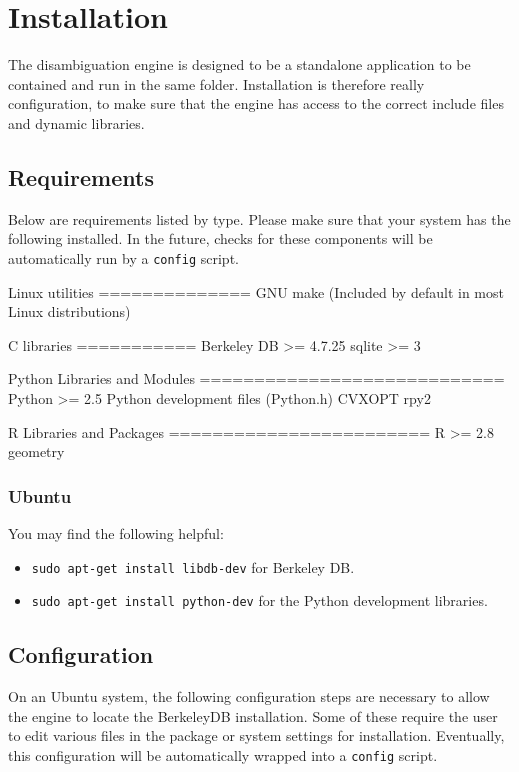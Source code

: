 \documentclass[10pt, letterpaper]{article}
\begin{document}
\section{Installation}
The disambiguation engine is designed to be a standalone application to be contained and run in the same folder.
Installation is therefore really configuration, to make sure that the engine has access to the correct include
files and dynamic libraries.
\subsection{Requirements}
Below are requirements listed by type. Please make sure that your system has the following installed.
In the future, checks for these components will be automatically run by a \texttt{config} script.

\begin{verbatimtab}
Linux utilities
==============
GNU make (Included by default in most Linux distributions)

C libraries
===========
Berkeley DB >= 4.7.25
sqlite >= 3

Python Libraries and Modules
============================
Python >= 2.5
Python development files (Python.h)
CVXOPT
rpy2

R Libraries and Packages
========================
R >= 2.8
geometry
\end{verbatimtab}


\subsubsection{Ubuntu}

You may find the following helpful:
\begin{itemize}
\item \texttt{sudo apt-get install libdb-dev} for Berkeley DB.
\item \texttt{sudo apt-get install python-dev} for the Python development libraries.
\end{itemize}


\subsection{Configuration}
On an Ubuntu system, the following configuration steps are necessary to allow the engine to
locate the BerkeleyDB installation.
Some of these require the user to edit various files in the package or
system settings for installation.
Eventually, this configuration will be automatically wrapped into a \texttt{config} script.
\end{document}
